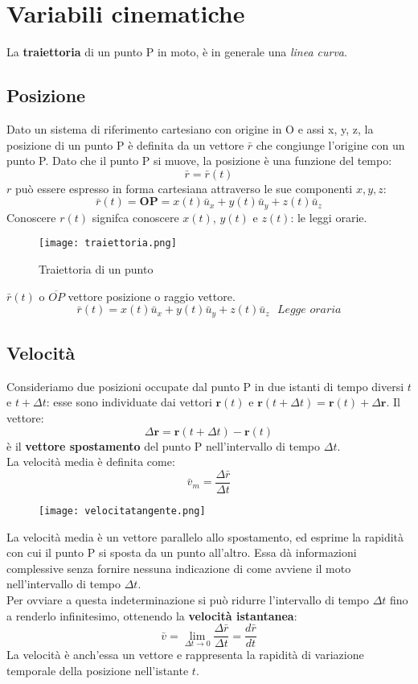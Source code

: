 \documentclass[../../main.tex]{subfiles}
\begin{document}
\section{Variabili cinematiche}
La \textbf{traiettoria} di un punto P in moto, è in generale una \textit{linea curva}.
\subsection{Posizione}
Dato un sistema di riferimento cartesiano con origine in O e assi x, y, z, la posizione di un punto P è definita da un vettore $\bar{r}$ che congiunge l'origine con un punto P. Dato che il punto P si muove, la posizione è una funzione del tempo:
\[ \bar{r} = \bar{r}(t) \]
$r$ può essere espresso in forma cartesiana attraverso le sue componenti $x, y, z$:
\[ \bar{r}(t) = \textbf{OP} = x(t)\bar{u}_x + y(t)\bar{u}_y + z(t)\bar{u}_z \]
Conoscere $r(t)$ signifca conoscere $x(t)$, $y(t)$ e $z(t)$: le leggi orarie.

\begin{figure}[h!]
    \centering
    \texttt{[image: traiettoria.png]}
    \caption{Traiettoria di un punto}
\end{figure}
$\bar{r}(t)$ o $\overline{OP}$ vettore posizione o raggio vettore.
\[
    \bar r(t) = x(t)\bar{u}_x + y(t)\bar{u}_y + z(t)\bar{u}_z \ \ \ \textit{Legge oraria}
\]

\subsection{Velocità}
Consideriamo due posizioni occupate dal punto P in due istanti di tempo diversi $t$ e $t + \Delta t$: esse sono individuate dai vettori $\textbf{r}(t)$ e $\textbf{r}(t + \Delta t) = \textbf{r}(t) + \Delta \textbf{r}$. Il vettore:
\[ \Delta \textbf{r} = \textbf{r}(t + \Delta t) - \textbf{r}(t) \]
è il \textbf{vettore spostamento} del punto P nell'intervallo di tempo $\Delta t$.\\
La velocità media è definita come:
\[ \bar{v}_m = \dfrac{\Delta \bar{r}}{\Delta t} \]
\begin{figure}[h!]
    \centering
    \texttt{[image: velocitatangente.png]}
    \label{fig:velocitatangente}
\end{figure}
La velocità media è un vettore parallelo allo spostamento, ed esprime la rapidità con cui il punto P si sposta da un punto all'altro.
Essa dà informazioni complessive senza fornire nessuna indicazione di come avviene il moto nell'intervallo di tempo $\Delta t$.\\
Per ovviare a questa indeterminazione si può ridurre l'intervallo di tempo $\Delta t$ fino a renderlo infinitesimo, ottenendo la \textbf{velocità istantanea}:
\[ \bar{v} = \lim_{\Delta t \to 0} \dfrac{\Delta \bar{r}}{\Delta t} = \dfrac{d\bar{r}}{dt} \]
La velocità è anch'essa un vettore e rappresenta la rapidità di variazione temporale della posizione nell'istante $t$.
\end{document}
